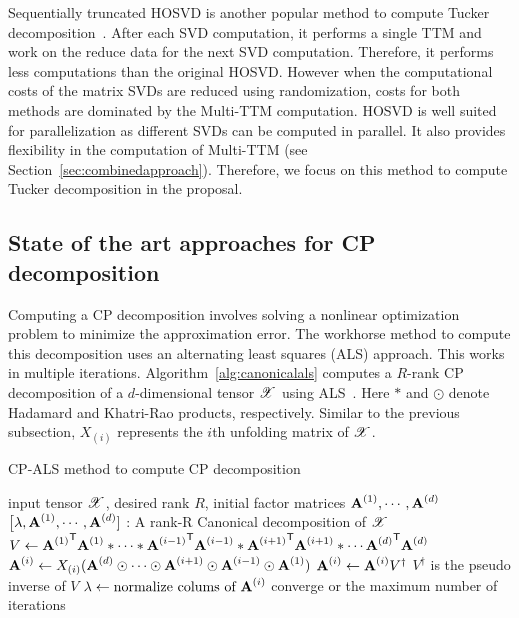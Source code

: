 \documentclass[a4paper,11pt]{article}
\newcommand{\X}{\T{X}}
\begin{document}
	
	Sequentially truncated HOSVD is another popular method to compute Tucker decomposition~\cite{VVM-SIAM-2012}. After each SVD computation, it performs a single TTM and work on the reduce data for the next SVD computation. Therefore, it performs less computations than the original HOSVD. However when the computational costs of the matrix SVDs are reduced using randomization, costs for both methods are dominated by the Multi-TTM computation. HOSVD is well suited for parallelization as different SVDs can be computed in parallel. It also provides flexibility in the computation of Multi-TTM (see Section~\ref{sec:combinedapproach}). Therefore, we focus on this method to compute Tucker decomposition in the proposal.		
	
	\subsection{State of the art approaches for CP decomposition}
	\label{sec:context:soa:Canonical}
	Computing a CP decomposition involves solving a nonlinear optimization problem to minimize the approximation error. The workhorse method to compute this decomposition uses an alternating least squares (ALS) approach. This works in multiple iterations. Algorithm~\ref{alg:canonicalals} computes a $R$-rank CP decomposition of a $d$-dimensional tensor $\X$ using ALS~\cite{KB-SIAM-2009}. Here $*$ and $\odot$ denote Hadamard and Khatri-Rao products, respectively. Similar to the previous subsection, $X_{(i)}$ represents the $i$th unfolding matrix of $\X$. 
	
	\begin{algorithm}[H]{
			\caption{CP-ALS method to compute CP decomposition\label{alg:canonicalals}}
			\begin{algorithmic}[1]
				\Require input tensor $\X$, desired rank $R$, initial factor matrices $\Mn{A}{1}, \cdots, \Mn{A}{d}$
				\Ensure $\big[\lambda, \Mn{A}{1}, \cdots, \Mn{A}{d}]$ : A rank-R Canonical decomposition of $\X$
				\Repeat
				\label{method:canonical:oneiter:start}
				\State $V\gets{\Mn{A}{1}}^\Tra{\Mn{A}{1}}*\cdots*{\Mn{A}{i-1}}^\Tra{\Mn{A}{i-1}}*{\Mn{A}{i+1}}^\Tra{\Mn{A}{i+1}}*\cdots{\Mn{A}{d}}^\Tra{\Mn{A}{d}}$
				\State ${\Mn{A}{i}}\gets X_{(i)} ({\Mn{A}{d}}\odot\cdots\odot{\Mn{A}{i+1}}\odot{\Mn{A}{i-1}}\odot {\Mn{A}{1}})$\label{alg:canonicalals:mttkrp}
				\State ${\Mn{A}{i}}\gets {\Mn{A}{i}}V^\dagger$ \Comment $V^\dagger$ is the pseudo inverse of $V$
				\State $\lambda\gets \text{normalize colums of }{\Mn{A}{i}}$ 
				\EndFor\label{method:canonical:oneiter:end}
				\Until converge or the maximum number of iterations
			\end{algorithmic}
	}\end{algorithm}
	
\end{document}

